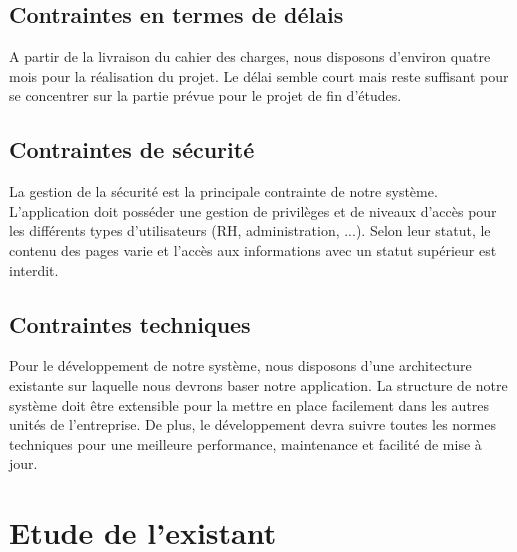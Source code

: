 \subsection{Contraintes en termes de délais}
A partir de la livraison du cahier des charges, nous disposons d’environ quatre mois pour la réalisation du projet. Le délai semble court mais reste suffisant pour se concentrer sur la partie prévue pour le projet de fin d’études.

\subsection{Contraintes de sécurité}
La gestion de la sécurité est la principale contrainte de notre système. L'application doit posséder une gestion de privilèges et de niveaux d'accès pour les différents types d'utilisateurs (RH, administration, ...). Selon leur statut, le contenu des pages varie et l'accès aux informations avec un statut supérieur est interdit.

\subsection{Contraintes techniques}

Pour le développement de notre système, nous disposons d’une architecture
existante sur laquelle nous devrons baser notre application. La structure de notre système doit être extensible pour la mettre en place facilement dans les autres unités de l’entreprise. De plus, le développement devra suivre toutes les normes techniques pour une meilleure performance, maintenance et facilité de mise à jour.

\section{Etude de l'existant}

